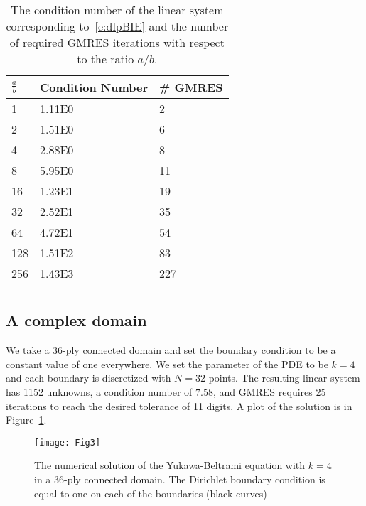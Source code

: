 \begin{table}[htps]
\caption{\label{t:example3} The condition number of the linear system
corresponding to~\eqref{e:dlpBIE} and the number of required GMRES
iterations with respect to the ratio $a/b$.}
\centering
\begin{tabular*}{0.8\textwidth}{@{\extracolsep{\fill}}lll}
$\frac{a}{b}$ & Condition Number & \# GMRES \\
\hline\noalign{\smallskip}
1   & 1.11E0 & 2   \\ 
2   & 1.51E0 & 6   \\
4   & 2.88E0 & 8   \\
8   & 5.95E0 & 11  \\
16  & 1.23E1 & 19  \\
32  & 2.52E1 & 35  \\
64  & 4.72E1 & 54  \\
128 & 1.51E2 & 83  \\
256 & 1.43E3 & 227 \\
\noalign{\smallskip}\hline
\end{tabular*}
\end{table}


\subsection{A complex domain}
We take a 36-ply connected domain and set the boundary condition to be a
constant value of one everywhere.  We set the parameter of the PDE to be
$k=4$ and each boundary is discretized with $N=32$ points.  The
resulting linear system has 1152 unknowns, a condition number of $7.58$,
and GMRES requires 25 iterations to reach the desired tolerance of 11
digits.  A plot of the solution is in Figure~\ref{f:36ply}.

\begin{figure}
  \centering
  \texttt{[image: Fig3]}
  \caption{\label{f:36ply} The numerical solution of the Yukawa-Beltrami
  equation with $k=4$ in a 36-ply connected domain.  The Dirichlet
  boundary condition is equal to one on each of the boundaries (black
  curves)}
\end{figure}

